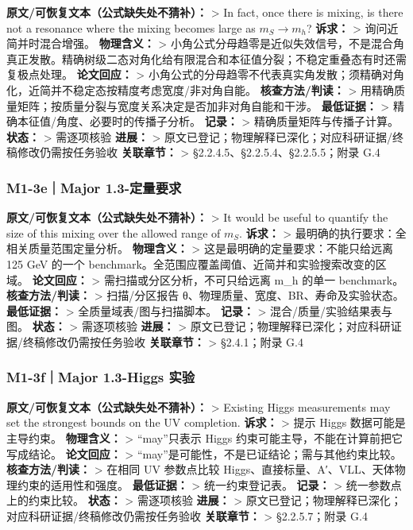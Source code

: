 \documentclass[
]{article}
\begin{document}
\textbf{原文/可恢复文本（公式缺失处不猜补）：} \textgreater{} In fact,
once there is mixing, is there not a resonance where the mixing becomes
large as \(m_S\to m_h\)? \textbf{诉求：} \textgreater{}
询问近简并时混合增强。 \textbf{物理含义：} \textgreater{}
小角公式分母趋零是近似失效信号，不是混合角真正发散。精确树级二态对角化给有限混合和本征值分裂；不稳定重叠态有时还需复极点处理。
\textbf{论文回应：} \textgreater{}
小角公式的分母趋零不代表真实角发散；须精确对角化，近简并不稳定态按精度考虑宽度/非对角自能。
\textbf{核查方法/判读：} \textgreater{}
用精确质量矩阵；按质量分裂与宽度关系决定是否加非对角自能和干涉。
\textbf{最低证据：} \textgreater{} 精确本征值/角度、必要时的传播子分析。
\textbf{记录：} \textgreater{} 精确质量矩阵与传播子计算。
\textbf{状态：} \textgreater{} 需逐项核验 \textbf{进展：} \textgreater{}
原文已登记；物理解释已深化；对应科研证据/终稿修改仍需按任务验收
\textbf{关联章节：} \textgreater{} §2.2.4.5、§2.2.5.4、§2.2.5.5；附录
G.4

\subsubsection{M1-3e｜Major
1.3-定量要求}\label{m1-3emajor-1.3-ux5b9aux91cfux8981ux6c42}

\textbf{原文/可恢复文本（公式缺失处不猜补）：} \textgreater{} It would
be useful to quantify the size of this mixing over the allowed range of
\(m_S\). \textbf{诉求：} \textgreater{}
最明确的执行要求：全相关质量范围定量分析。 \textbf{物理含义：}
\textgreater{} 这是最明确的定量要求：不能只给远离 125 GeV 的一个
benchmark。全范围应覆盖阈值、近简并和实验搜索改变的区域。
\textbf{论文回应：} \textgreater{} 需扫描或分区分析，不可只给远离 m\_h
的单一 benchmark。 \textbf{核查方法/判读：} \textgreater{} 扫描/分区报告
θ、物理质量、宽度、BR、寿命及实验状态。 \textbf{最低证据：}
\textgreater{} 全质量域表/图与扫描脚本。 \textbf{记录：} \textgreater{}
混合/质量/实验结果表与图。 \textbf{状态：} \textgreater{} 需逐项核验
\textbf{进展：} \textgreater{}
原文已登记；物理解释已深化；对应科研证据/终稿修改仍需按任务验收
\textbf{关联章节：} \textgreater{} §2.4.1；附录 G.4

\subsubsection{M1-3f｜Major 1.3-Higgs
实验}\label{m1-3fmajor-1.3-higgs-ux5b9eux9a8c}

\textbf{原文/可恢复文本（公式缺失处不猜补）：} \textgreater{} Existing
Higgs measurements may set the strongest bounds on the UV completion.
\textbf{诉求：} \textgreater{} 提示 Higgs 数据可能是主导约束。
\textbf{物理含义：} \textgreater{} ``may''只表示 Higgs
约束可能主导，不能在计算前把它写成结论。 \textbf{论文回应：}
\textgreater{} ``may''是可能性，不是已证结论；需与其他约束比较。
\textbf{核查方法/判读：} \textgreater{} 在相同 UV 参数点比较
Higgs、直接标量、A′、VLL、天体物理约束的适用性和强度。
\textbf{最低证据：} \textgreater{} 统一约束登记表。 \textbf{记录：}
\textgreater{} 统一参数点上的约束比较。 \textbf{状态：} \textgreater{}
需逐项核验 \textbf{进展：} \textgreater{}
原文已登记；物理解释已深化；对应科研证据/终稿修改仍需按任务验收
\textbf{关联章节：} \textgreater{} §2.2.5.7；附录 G.4
\end{document}
